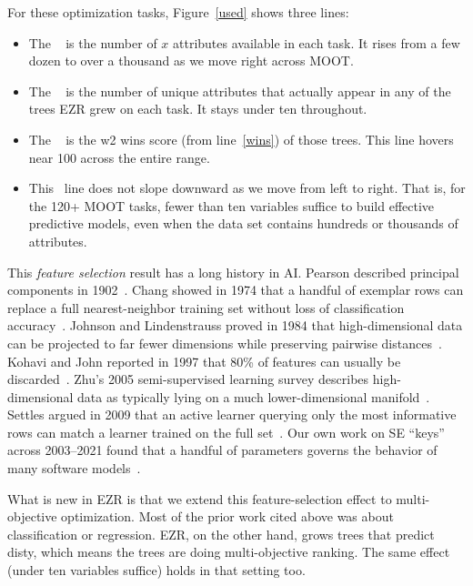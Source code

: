 \documentclass[AMA,STIX2COL]{WileyNJDv5}
\newcommand{\IT}{{\sffamily EZR}}
\begin{document}
For these optimization tasks, Figure~\ref{used} shows three lines:

\begin{itemize}
\item The \color{darkyellow}{\bf yellow line}\color{black}~ is
the number of $x$ attributes available in each task. It rises
from a few dozen to over a thousand as we move right across
MOOT.
\item The \color{red}{\bf red line}\color{black}~ is the number
of unique attributes that actually appear in any of the trees
\IT{} grew on each task. It stays under ten throughout.
\item The \color{blue}{\bf blue line}\color{black}~ is the
\textsf{w2} 
\textsf{wins} score (from line~\ref{wins}) of those trees. 
This line  hovers near 100 across the entire range.
\item
This  \color{blue}{\bf blue line}\color{black}~line does not slope downward as we move from left to right. 
That is, 
for the  120+ MOOT tasks, fewer than ten variables suffice to
build effective predictive models, even when the data set
contains hundreds or thousands of attributes.
\end{itemize}
This {\em feature selection} result
has a long history in AI. Pearson described principal
components in 1902~\cite{pca}. Chang showed in 1974 that a
handful of exemplar rows can replace a full nearest-neighbor
training set without loss of classification
accuracy~\cite{chang74}. Johnson and Lindenstrauss proved in
1984 that high-dimensional data can be projected to far fewer
dimensions while preserving pairwise
distances~\cite{johnson1984extensions}. Kohavi and John reported
in 1997 that 80\% of features can usually be
discarded~\cite{kohavi97}. Zhu's 2005 semi-supervised learning
survey describes high-dimensional data as typically lying on a
much lower-dimensional manifold~\cite{zhu2005semi}. Settles
argued in 2009 that an active learner querying only the most
informative rows can match a learner trained on the full
set~\cite{settles2009active}. Our own work on SE ``keys'' across
2003--2021 found that a handful of parameters governs the
behavior of many software
models~\cite{me03a,me07a,me21a,menzies2008implications}.

What is new in \IT{} is that we extend this feature-selection effect
to
multi-objective optimization. Most of the prior work cited above
was about classification or regression. \IT{}, on the other hand, grows trees that
predict \textsf{disty}, which means the trees are doing
multi-objective ranking. The same effect (under ten variables
suffice) holds in that setting too.
\end{document}
